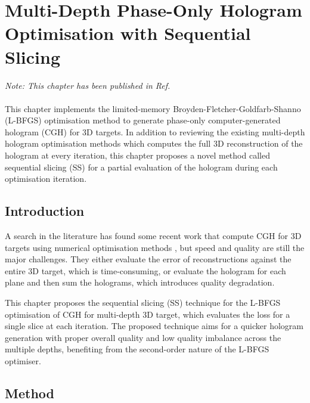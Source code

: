 \chapter{Multi-Depth Phase-Only Hologram Optimisation with Sequential Slicing}\label{chapter:Multi-Depth Phase-Only Hologram Optimisation}

\graphicspath{{Chapter_Multi_depth_optim/Figs/}}

\textit{Note: This chapter has been published in Ref. \cite{Sha2023}}\\\\

This chapter implements the limited-memory Broyden-Fletcher-Goldfarb-Shanno (L-BFGS) optimisation method to generate phase-only computer-generated hologram (CGH) for 3D targets. In addition to reviewing the existing multi-depth hologram optimisation methods which computes the full 3D reconstruction of the hologram at every iteration, this chapter proposes a novel method called sequential slicing (SS) for a partial evaluation of the hologram during each optimisation iteration.

\section{Introduction}
A search in the literature has found some recent work that compute CGH for 3D targets using numerical optimisation methods \cite{Zhang2017, Liu2020, Choi2021, Chen2021}, but speed and quality are still the major challenges. They either evaluate the error of reconstructions against the entire 3D target, which is time-consuming, or evaluate the hologram for each plane and then sum the holograms, which introduces quality degradation.

This chapter proposes the sequential slicing (SS) technique for the L-BFGS optimisation of CGH for multi-depth 3D target, which evaluates the loss for a single slice at each iteration. The proposed technique aims for a quicker hologram generation with proper overall quality and low quality imbalance across the multiple depths, benefiting from the second-order nature of the L-BFGS optimiser.


\section{Method}

